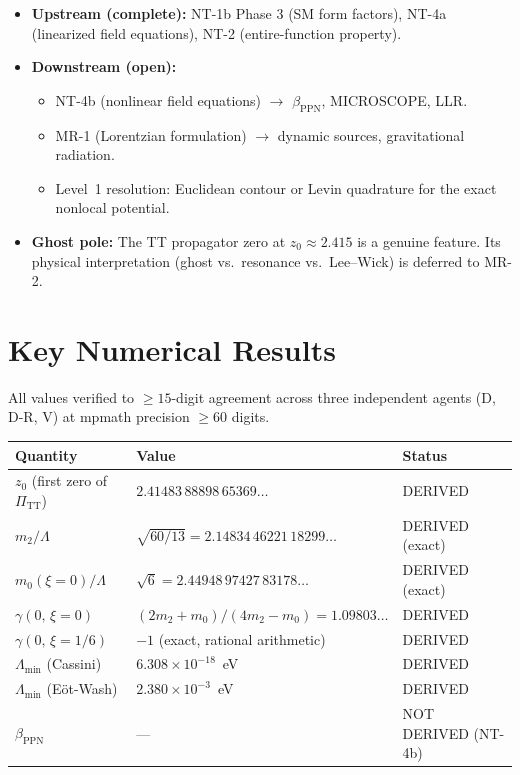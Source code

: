 \documentclass[11pt,a4paper]{article}
\begin{document}
\begin{itemize}[leftmargin=2em]
  \item \textbf{Upstream (complete):} NT-1b Phase 3 (SM form factors),
  NT-4a (linearized field equations), NT-2 (entire-function property).
  \item \textbf{Downstream (open):}
    \begin{itemize}
      \item NT-4b (nonlinear field equations) $\to$ $\beta_{\mathrm{PPN}}$,
        MICROSCOPE, LLR.
      \item MR-1 (Lorentzian formulation) $\to$ dynamic sources, gravitational
        radiation.
      \item Level~1 resolution: Euclidean contour or Levin quadrature for the
        exact nonlocal potential.
    \end{itemize}
  \item \textbf{Ghost pole:} The TT propagator zero at $z_0 \approx 2.415$ is a
  genuine feature.  Its physical interpretation (ghost vs.\ resonance vs.\
  Lee--Wick) is deferred to MR-2.
\end{itemize}

\section{Key Numerical Results}

All values verified to $\geq\!15$-digit agreement across three independent agents
(D, D-R, V) at mpmath precision $\geq\!60$ digits.

\begin{center}
\renewcommand{\arraystretch}{1.3}
\begin{tabular}{lll}
  \toprule
  \textbf{Quantity} & \textbf{Value} & \textbf{Status} \\
  \midrule
  $z_0$ (first zero of $\Pi_{\mathrm{TT}}$)
    & $2.41483\,88898\,65369\ldots$  & DERIVED \\
  $m_2 / \Lambda$
    & $\sqrt{60/13} = 2.14834\,46221\,18299\ldots$  & DERIVED (exact) \\
  $m_0(\xi\!=\!0) / \Lambda$
    & $\sqrt{6} = 2.44948\,97427\,83178\ldots$  & DERIVED (exact) \\
  $\gamma(0,\,\xi\!=\!0)$
    & $(2m_2{+}m_0)/(4m_2{-}m_0) = 1.09803\ldots$  & DERIVED \\
  $\gamma(0,\,\xi\!=\!1/6)$
    & $-1$ (exact, rational arithmetic)  & DERIVED \\
  $\Lambda_{\min}$ (Cassini)
    & $6.308 \times 10^{-18}$~eV  & DERIVED \\
  $\Lambda_{\min}$ (E\"ot-Wash)
    & $2.380 \times 10^{-3}$~eV  & DERIVED \\
  $\beta_{\mathrm{PPN}}$
    & --- & NOT DERIVED (NT-4b) \\
  \bottomrule
\end{tabular}
\end{center}
\end{document}
